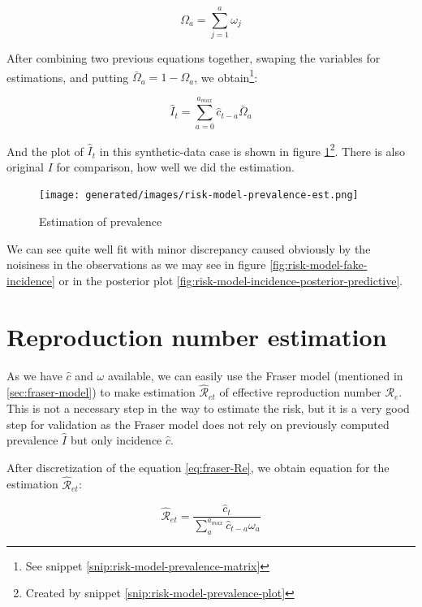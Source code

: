 \documentclass[
  digital, %
  oneside, %
  lof,     %
  lot,     %
]{fithesis4}
\begin{document}
\begin{equation}
  \Omega_a = \sum_{j = 1}^a \omega_j
\end{equation}

After combining two previous equations together,
swaping the variables for estimations, and putting $\bar{\Omega}_a = 1 - \Omega_a$, we obtain\footnote{See snippet \ref{snip:risk-model-prevalence-matrix}}:

\begin{equation}\label{eq:prevalence-est}
  \hat{I}_t = \sum_{a=0}^{a_{max}} \hat{c}_{t - a} \bar{\Omega}_a
\end{equation}

And the plot of $\hat{I}_t$ in this synthetic-data case
is shown in figure \ref{fig:risk-model-prevalence-est}\footnote{Created by snippet \ref{snip:risk-model-prevalence-plot}}.
There is also original $I$ for comparison, how 
well we did the estimation.

\begin{figure}[H]
  \begin{center}
    \texttt{[image: generated/images/risk-model-prevalence-est.png]}
  \end{center}
  \caption{Estimation of prevalence}
  \label{fig:risk-model-prevalence-est}
\end{figure}

We can see quite well fit with minor discrepancy caused obviously
by the noisiness in the observations as we may see in figure \ref{fig:risk-model-fake-incidence} or in
the posterior plot \ref{fig:risk-model-incidence-posterior-predictive}.


\section{Reproduction number estimation}

As we have $\hat{c}$ and $\omega$ available, we 
can easily use the Fraser model (mentioned 
in \autoref{sec:fraser-model}) to make estimation $\hat{\mathcal{R}}_{et}$
of effective reproduction number $\mathcal{R}_e$.
This is not a necessary step in the way to estimate the risk,
but it is a very good step for validation as 
the Fraser model does not rely on previously computed 
prevalence $\hat{I}$ but only incidence $\hat{c}$.

After discretization of the 
equation \ref{eq:fraser-Re}, we 
obtain equation for the estimation $\hat{\mathcal{R}}_{et}$:

\begin{equation}
  \hat{\mathcal{R}}_{et} = \frac{\hat{c}_t}{\sum_a^{a_{max}} \hat{c}_{t - a} \omega_a}
\end{equation}
\end{document}
